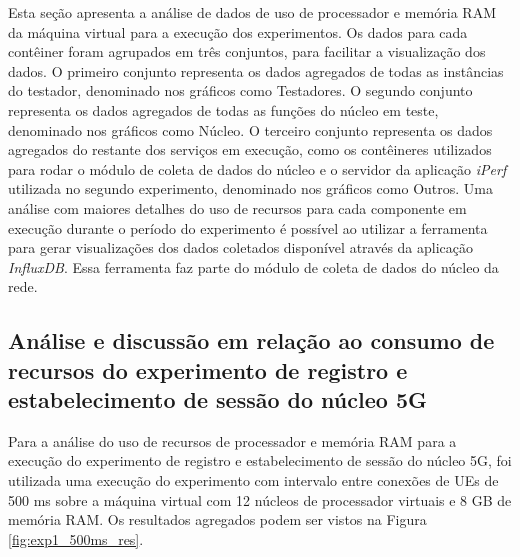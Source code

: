 Esta seção apresenta a análise de dados de uso de processador e memória RAM da máquina virtual para a execução dos experimentos.
Os dados para cada contêiner foram agrupados em três conjuntos, para facilitar a visualização dos dados.
O primeiro conjunto representa os dados agregados de todas as instâncias do testador, denominado nos gráficos como Testadores.
O segundo conjunto representa os dados agregados de todas as funções do núcleo em teste, denominado nos gráficos como Núcleo.
O terceiro conjunto representa os dados agregados do restante dos serviços em execução, como os contêineres utilizados para rodar o módulo de coleta de dados do núcleo e o servidor da aplicação \textit{iPerf} utilizada no segundo experimento, denominado nos gráficos como Outros.
Uma análise com maiores detalhes do uso de recursos para cada componente em execução durante o período do experimento é possível ao utilizar a ferramenta para gerar visualizações dos dados coletados disponível através da aplicação \textit{InfluxDB}.
Essa ferramenta faz parte do módulo de coleta de dados do núcleo da rede.

\subsection{Análise e discussão em relação ao consumo de recursos do experimento de registro e estabelecimento de sessão do núcleo 5G}

Para a análise do uso de recursos de processador e memória RAM para a execução do experimento de registro e estabelecimento de sessão do núcleo 5G, foi utilizada uma execução do experimento com intervalo entre conexões de UEs de 500 ms sobre a máquina virtual com 12 núcleos de processador virtuais e 8 GB de memória RAM.
Os resultados agregados podem ser vistos na Figura \ref{fig:exp1_500ms_res}.

